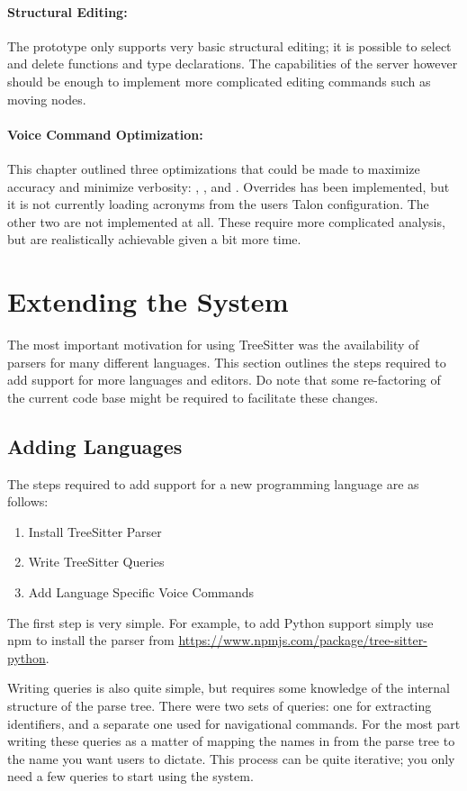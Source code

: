 \documentclass[../thesis.tex]{subfiles}
\begin{document}
\paragraph{Structural Editing:}
The prototype only supports very basic structural editing;
it is possible to select and delete functions and type declarations.
The capabilities of the server however should be enough to implement
more complicated editing commands such as moving nodes.

\paragraph{Voice Command Optimization:}
This chapter outlined three optimizations that could be made to maximize accuracy
and minimize verbosity: , , and .
Overrides has been implemented, but it is not currently loading acronyms from the users Talon configuration.
The other two are not implemented at all.
These require more complicated analysis, but are realistically achievable given a bit more time.

\section{Extending the System}%
\label{sec:extending_the_system}
The most important motivation for using TreeSitter was the availability
of parsers for many different languages.
This section outlines the steps required to add support for more languages and editors.
Do note that some re-factoring of the current code base might be required
to facilitate these changes.

\subsection{Adding Languages}
The steps required to add support for a new programming language are as follows:
\begin{enumerate}
    \item Install TreeSitter Parser
    \item Write TreeSitter Queries
    \item Add Language Specific Voice Commands
\end{enumerate}
The first step is very simple.
For example, to add Python support simply use npm to install the parser from \url{https://www.npmjs.com/package/tree-sitter-python}.

Writing queries is also quite simple, but requires some knowledge of the internal structure
of the parse tree.
There were two sets of queries: one for extracting identifiers, and a separate one
used for navigational commands.
For the most part writing these queries as a matter of mapping the names
in from the parse tree to the name you want users to dictate.
This process can be quite iterative; you only need a few queries to start using the system.
\end{document}

